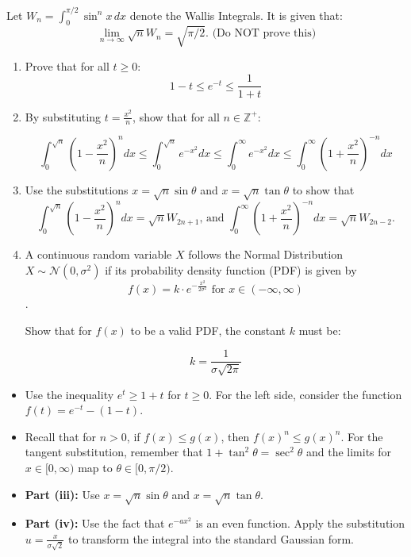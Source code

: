 \begin{problem}
Let $W_n = \int_0^{\pi/2} \sin^n x \, dx$ denote the Wallis Integrals. It is given that:
\[ \lim_{n \to \infty} \sqrt{n} W_n = \sqrt{\pi/2}. 
\text{ (Do NOT prove this)}
\]


\begin{enumerate}
   \item[(i)] Prove that for all $t \ge 0$:
   \[ 1 - t \le e^{-t} \le \frac{1}{1+t} \]    
   \item[(ii)] By substituting $t = \frac{x^2}{n}$, show that for all $n \in \mathbb{Z}^+$:
   
   \[ \int_0^{\sqrt{n}} \left(1 - \frac{x^2}{n}\right)^n dx 
   \le \int_0^{\sqrt{n}} e^{-x^2} dx 
   \le \int_0^{\infty} e^{-x^2} dx 
   \le \int_0^{\infty} \left(1 + \frac{x^2}{n}\right)^{-n} dx \]    
   
   \item[(iii)] Use the substitutions $x = \sqrt{n}\sin\theta$ and $x = \sqrt{n}\tan\theta$ to show that 
   $$\int_0^{\sqrt{n}} \left(1 - \frac{x^2}{n}\right)^n dx = \sqrt{n} W_{2n+1} 
   \text{, and } 
   \int_0^{\infty} \left(1 + \frac{x^2}{n}\right)^{-n} dx = \sqrt{n} W_{2n-2}.$$

   \item[(iv)] A continuous random variable $X$ follows the Normal Distribution $X \sim \mathcal{N}(0, \sigma^2)$ if its probability density function (PDF) is given by 
   $$f(x) = k \cdot e^{-\frac{x^2}{2\sigma^2}} \text{ for } x \in (-\infty, \infty)$$. 

   Show that for $f(x)$ to be a valid PDF, the constant $k$ must be:
   
   $$k = \frac{1}{\sigma\sqrt{2\pi}}$$

\end{enumerate}
\end{problem}

\begin{hint}
\begin{itemize}
    \item Use the inequality $e^t \ge 1+t$ for $t \ge 0$. For the left side, consider the function $f(t) = e^{-t} - (1-t)$.
    \item Recall that for $n > 0$, if $f(x) \le g(x)$, then $f(x)^n \le g(x)^n$. For the tangent substitution, remember that $1 + \tan^2 \theta = \sec^2 \theta$ and the limits for $x \in [0, \infty)$ map to $\theta \in [0, \pi/2)$.
   \item \textbf{Part (iii):} Use $x = \sqrt{n}\sin\theta$ and $x = \sqrt{n}\tan\theta$.
   \item \textbf{Part (iv):} Use the fact that $e^{-ax^2}$ is an even function. Apply the substitution $u = \frac{x}{\sigma\sqrt{2}}$ to transform the integral into the standard Gaussian form.
\end{itemize}
\end{hint}

